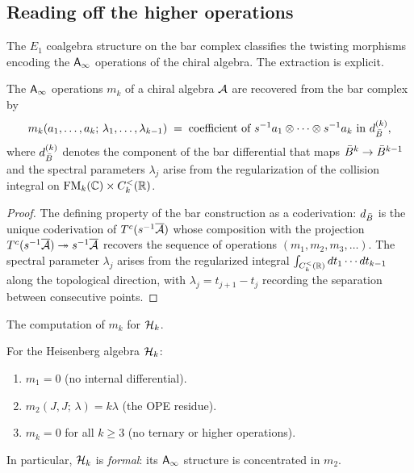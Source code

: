 \subsection{Reading off the higher operations}
\label{subsec:rosetta-operations}

The $E_1$ coalgebra structure on the bar complex classifies the twisting morphisms encoding the $\mathsf{A}_{\infty}$ operations of the chiral algebra. The extraction is explicit.

\begin{proposition}
\label{prop:rosetta-operations}
The $\mathsf{A}_{\infty}$ operations $m_k$ of a chiral algebra $\mathcal{A}$ are recovered from the bar complex by
\begin{equation}\label{eq:rosetta-mk-extraction}
m_k(a_1, \ldots, a_k;\, \lambda_1, \ldots, \lambda_{k-1})
\;=\;
\text{coefficient of }
s^{-1}a_1 \otimes \cdots \otimes s^{-1}a_k
\text{ in }
d_{\bar{B}}^{(k)},
\end{equation}
where $d_{\bar{B}}^{(k)}$ denotes the component of the bar
differential that maps $\bar{B}^k \to \bar{B}^{k-1}$ and the
spectral parameters $\lambda_j$ arise from the regularization
of the collision integral on $\mathrm{FM}_k(\mathbb{C}) \times C_k^{<}(\mathbb{R})$.
\end{proposition}

\begin{proof}
The defining property of the bar construction as a coderivation: $d_{\bar{B}}$ is the unique coderivation of $T^c(s^{-1}\overline{\mathcal{A}})$ whose composition with the projection $T^c(s^{-1}\overline{\mathcal{A}}) \twoheadrightarrow s^{-1}\overline{\mathcal{A}}$ recovers the sequence of operations $(m_1, m_2, m_3, \ldots)$. The spectral parameter $\lambda_j$ arises from the regularized integral $\int_{C_k^{<}(\mathbb{R})} dt_1 \cdots dt_{k-1}$ along the topological direction, with $\lambda_j = t_{j+1} - t_j$ recording the separation between consecutive points.
\end{proof}

The computation of $m_k$ for $\mathcal{H}_k$.

\begin{proposition}
\label{prop:rosetta-heisenberg-mk}
For the Heisenberg algebra $\mathcal{H}_k$:
\begin{enumerate}[label=\textup{(\roman*)}]
\item $m_1 = 0$ \textup{(}no internal differential\textup{)}.
\item $m_2(J, J;\, \lambda) = k\lambda$
 \textup{(}the OPE residue\textup{)}.
\item $m_k = 0$ for all $k \geq 3$
 \textup{(}no ternary or higher operations\textup{)}.
\end{enumerate}
In particular, $\mathcal{H}_k$ is \emph{formal}: its $\mathsf{A}_{\infty}$ structure is
concentrated in $m_2$.
\end{proposition}

